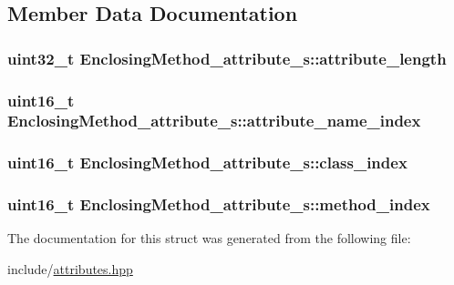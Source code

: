 \subsection{Member Data Documentation}
\hypertarget{structEnclosingMethod__attribute__s_a47d67cf5da95073e23f63b07819726ac}{
\subsubsection[{attribute\+\_\+length}]{\setlength{\rightskip}{0pt plus 5cm}uint32\+\_\+t Enclosing\+Method\+\_\+attribute\+\_\+s\+::attribute\+\_\+length}}\label{structEnclosingMethod__attribute__s_a47d67cf5da95073e23f63b07819726ac}
\hypertarget{structEnclosingMethod__attribute__s_ad2b896b9d74117aadabfcc0a451f0df4}{
\subsubsection[{attribute\+\_\+name\+\_\+index}]{\setlength{\rightskip}{0pt plus 5cm}uint16\+\_\+t Enclosing\+Method\+\_\+attribute\+\_\+s\+::attribute\+\_\+name\+\_\+index}}\label{structEnclosingMethod__attribute__s_ad2b896b9d74117aadabfcc0a451f0df4}
\hypertarget{structEnclosingMethod__attribute__s_a4f0350de4c8297324b3d4fa1afd5e5f8}{
\subsubsection[{class\+\_\+index}]{\setlength{\rightskip}{0pt plus 5cm}uint16\+\_\+t Enclosing\+Method\+\_\+attribute\+\_\+s\+::class\+\_\+index}}\label{structEnclosingMethod__attribute__s_a4f0350de4c8297324b3d4fa1afd5e5f8}
\hypertarget{structEnclosingMethod__attribute__s_ab6428de4b25c84e1ef61d3c806932823}{
\subsubsection[{method\+\_\+index}]{\setlength{\rightskip}{0pt plus 5cm}uint16\+\_\+t Enclosing\+Method\+\_\+attribute\+\_\+s\+::method\+\_\+index}}\label{structEnclosingMethod__attribute__s_ab6428de4b25c84e1ef61d3c806932823}


The documentation for this struct was generated from the following file\+:\begin{DoxyCompactItemize}
\item 
include/\hyperlink{attributes_8hpp}{attributes.\+hpp}\end{DoxyCompactItemize}

